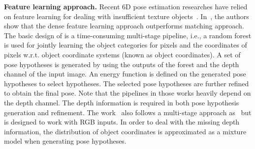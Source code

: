 \documentclass[conference]{IEEEtran}
\newcommand{\junk}[1]{}
\begin{document}
\textbf{Feature learning approach.} Recent 6D pose estimation researches have relied on feature learning for dealing with insufficient texture objects~\cite{ECCV14,ICCV15,CVPR17,CVPR17_2}. In~\cite{ECCV14,ICCV15}, the authors show that the dense feature learning approach outperforms matching approach. The basic  design of \cite{ECCV14,ICCV15,CVPR17,CVPR17_2} is a time-consuming multi-stage pipeline, i.e., a random forest is used for jointly learning the object categories for pixels %
and the coordinates of pixels w.r.t. object coordinate systems (known as object coordinates). A set of pose hypotheses is generated by using the outputs of the forest and the depth channel of the input image. %
An energy function is defined on the generated pose hypotheses to select hypotheses. The selected pose hypotheses are further refined to obtain the final pose. Note that the pipelines in those works heavily depend on the depth channel. The depth information is required in both pose hypothesis generation and refinement. The work~\cite{CVPR16} also follows a multi-stage approach as~\cite{ECCV14,ICCV15} but is designed to work with RGB inputs. %
In order to deal with the missing depth information, the distribution of object coordinates is approximated as a mixture model when generating pose hypotheses. 

\junk{
The disadvantage of feature learning approaches~\cite{ECCV14,ICCV15,CVPR16,CVPR17_2} is that the generation of pose hypotheses uses only local information, i.e., only three or four pixels are used to generate a hypothesis. As result, this may generate bad hypotheses because it does not consider a global context over the whole object. Furthermore, by requiring multiple processing steps, those approaches are are time-consuming, making them unsuitable for real-time applications. 
}%
\end{document}
